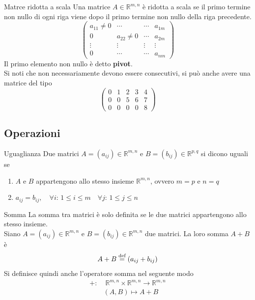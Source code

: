 \begin{Def}{Matrce ridotta a scala}
  Una matrice $A\in\mathbb{R}^{m,n}$ è ridotta a scala se il primo termine non nullo di
  ogni riga viene dopo il primo termine non nullo della riga precedente.
  \begin{equation*}
    \begin{pmatrix}
      a_{11}\neq0 & \cdots & \cdots & a_{1m}\\
      0 & a_{22}\neq0 & \cdots & a_{2m}\\
      \vdots & \vdots & \vdots & \vdots\\
      0 & \cdots & \cdots & a_{nm}
    \end{pmatrix}
  \end{equation*}
  Il primo elemento non nullo è detto \textbf{pivot}.\\
  Si noti che non necessariamente devono essere consecutivi, si può anche avere una
  matrice del tipo
  \begin{equation*}
    \begin{pmatrix}
      0 & 1 & 2 & 3 & 4\\
      0 & 0 & 5 & 6 & 7\\
      0 & 0 & 0 & 0 & 8
    \end{pmatrix}
  \end{equation*}
\end{Def}

\subsection{Operazioni}%
\label{sub:operazioni}

\begin{Def}{Uguaglianza}
  Due matrici $A=(a_{ij})\in\mathbb{R}^{m,n}$ e $B=(b_{ij})\in\mathbb{R}^{p,q}$ si dicono
  uguali se
  \begin{enumerate}
    \item $A$ e $B$ appartengono allo stesso insieme $\mathbb{R}^{m,n}$, ovvero $m=p$ e
      $n=q$
    \item $a_{ij} = b_{ij},\quad\forall i:\,1\leq i\leq m \quad\forall j:\,1\leq j\leq n$
  \end{enumerate}
\end{Def}

\begin{Def}{Somma}\label{def:matrice_somma}
  La somma tra matrici è solo definita se le due matrici appartengono allo stesso
  insieme.\\
  Siano $A=(a_{ij})\in\mathbb{R}^{m,n}$ e $B=(b_{ij})\in\mathbb{R}^{m,n}$ due matrici.
  La loro somma $A+B$ è
  \begin{equation*}
    A+B\overset{\text{def}}{=} (a_{ij}+b_{ij})
  \end{equation*}
  Si definisce quindi anche l'operatore somma nel seguente modo
  \begin{align*}
    +:&\;\mathbb{R}^{m,n}\times\mathbb{R}^{m,n}\rightarrow\mathbb{R}^{m,n}\\
      & (A,B)\mapsto A+B
  \end{align*}
\end{Def}

